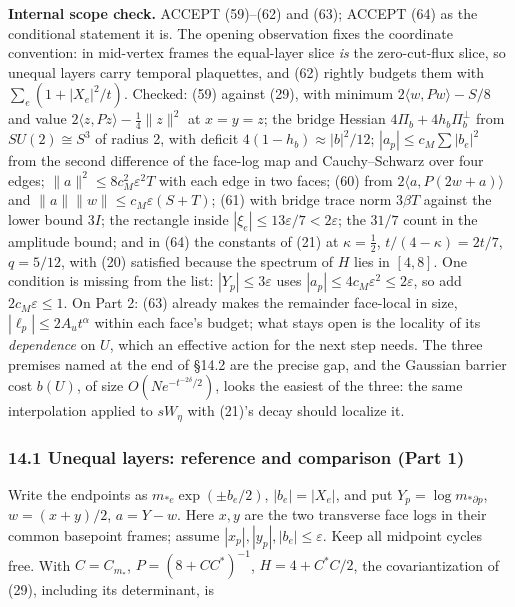 \documentclass[11pt,a4paper]{article}
\begin{document}
\textbf{Internal scope check.} ACCEPT (59)--(62) and (63); ACCEPT (64)
as the conditional statement it is. The opening observation fixes the
coordinate convention: in mid-vertex frames the equal-layer slice
\emph{is} the zero-cut-flux slice, so unequal layers carry temporal
plaquettes, and (62) rightly budgets them with \(\sum_e(1+|X_e|^2/t)\).
Checked: (59) against (29), with minimum \(2\langle w,Pw\rangle-S/8\)
and value \(2\langle z,Pz\rangle-\frac14\|z\|^2\) at \(x=y=z\); the
bridge Hessian \(4\Pi_b+4h_b\Pi_b^\perp\) from \(SU(2)\cong S^3\) of
radius 2, with deficit \(4(1-h_b)\approx|b|^2/12\);
\(|a_p|\le c_M\sum|b_e|^2\) from the second difference of the face-log
map and Cauchy--Schwarz over four edges;
\(\|a\|^2\le8c_M^2\varepsilon^2T\) with each edge in two faces; (60)
from \(2\langle a,P(2w+a)\rangle\) and
\(\|a\|\|w\|\le c_M\varepsilon(S+T)\); (61) with bridge trace norm
\(3\beta T\) against the lower bound \(3I\); the rectangle inside
\(|\xi_e|\le13\varepsilon/7<2\varepsilon\); the \(31/7\) count in the
amplitude bound; and in (64) the constants of (21) at
\(\kappa=\frac12\), \(t/(4-\kappa)=2t/7\), \(q=5/12\), with (20)
satisfied because the spectrum of \(H\) lies in \([4,8]\). One condition
is missing from the list: \(|Y_p|\le3\varepsilon\) uses
\(|a_p|\le4c_M\varepsilon^2\le2\varepsilon\), so add
\(2c_M\varepsilon\le1\). On Part 2: (63) already makes the remainder
face-local in size, \(|\ell_p|\le2A_ut^\alpha\) within each face's
budget; what stays open is the locality of its \emph{dependence} on
\(U\), which an effective action for the next step needs. The three
premises named at the end of §14.2 are the precise gap, and the Gaussian
barrier cost \(b(U)\), of size \(O(Ne^{-t^{-2\delta}/2})\), looks the
easiest of the three: the same interpolation applied to \(sW_\eta\) with
(21)'s decay should localize it.

\hypertarget{unequal-layers-reference-and-comparison-part-1}{%
\subsubsection{14.1 Unequal layers: reference and comparison (Part
1)}\label{unequal-layers-reference-and-comparison-part-1}}

Write the endpoints as \(m_{*e}\exp(\pm b_e/2)\), \(|b_e|=|X_e|\), and
put \(Y_p=\log m_{*\partial p}\), \(w=(x+y)/2\), \(a=Y-w\). Here \(x,y\)
are the two transverse face logs in their common basepoint frames;
assume \(|x_p|,|y_p|,|b_e|\le\varepsilon\). Keep all midpoint cycles
free. With \(C=C_{m_*}\), \(P=(8+CC^*)^{-1}\), \(H=4+C^*C/2\), the
covariantization of (29), including its determinant, is
\end{document}
